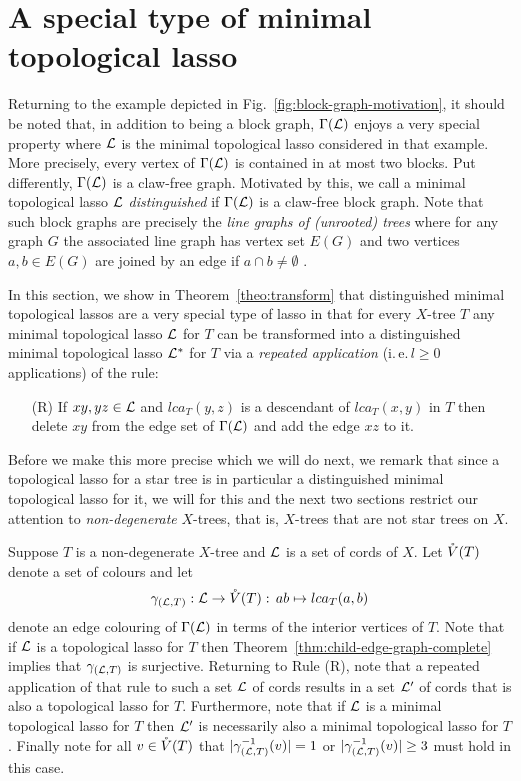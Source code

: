 \section{A special type of minimal topological lasso}
\label{sec:distinguished}

Returning to the example depicted in Fig.~\ref{fig:block-graph-motivation}, it
should be noted that, in addition to being a block graph, $\Gamma({\mathcal L})$ enjoys
a very special property where ${\mathcal L}$ is the minimal topological lasso
considered in that example. More precisely, every vertex of $\Gamma({\mathcal L})$ is
contained in at most two blocks.  Put differently, $\Gamma({\mathcal L})$ is a
claw-free graph. Motivated by this, we call a minimal topological lasso ${\mathcal L}$
{\em distinguished} if $\Gamma({\mathcal L})$ is a claw-free block graph.  Note that
such block graphs are precisely the {\em line graphs of (unrooted) trees}
where for any graph $G$ the associated line graph has vertex set $E(G)$ and
two vertices $a,b\in E(G)$ are joined by an edge if $a\cap b\not=\emptyset$
\cite{H72}.

In this section, we show in Theorem~\ref{theo:transform} that distinguished
minimal topological lassos are a very special type of lasso in that for every
$X$-tree $T$ any minimal topological lasso ${\mathcal L}$ for $T$ can be transformed
into a distinguished minimal topological lasso ${\mathcal L}^*$ for $T$ via a {\em
  repeated application} (i.\,e.\,$l\geq 0$ applications) of the rule:

\begin{enumerate}
\item[(R)] If $xy,yz\in {\mathcal L}$ and $lca_T(y,z)$ is a descendant of $lca_T(x,y)$
  in $T$ then delete $xy$ from the edge set of $\Gamma({\mathcal L})$ and add the edge
  $xz$ to it.
\end{enumerate}

Before we make this more precise which we will do next, we remark that since a
topological lasso for a star tree is in particular a distinguished minimal
topological lasso for it, we will for this and the next two sections restrict
our attention to {\em non-degenerate} $X$-trees, that is, $X$-trees that are
not star trees on $X$.

Suppose $T$ is a non-degenerate $X$-tree and ${\mathcal L}$ is a set of cords of
$X$. Let $\mathring{V}(T)$ denote a set of colours and let
$$
\gamma_{({\mathcal L},T)}:{\mathcal L}\to \mathring{V}(T):\, ab\mapsto lca_T(a,b)
$$
denote an edge colouring of $\Gamma({\mathcal L})$ in terms of the interior vertices of
$T$. Note that if ${\mathcal L}$ is a topological lasso for $T$ then
Theorem~\ref{thm:child-edge-graph-complete} implies that $\gamma_{({\mathcal L},T)}$
is surjective. Returning to Rule (R), note that a repeated application of that
rule to such a set ${\mathcal L}$ of cords results in a set ${\mathcal L}'$ of cords that is
also a topological lasso for $T$. Furthermore, note that if ${\mathcal L}$ is a minimal
topological lasso for $T$ then ${\mathcal L}'$ is necessarily also a minimal
topological lasso for $T$. Finally note for all $v\in \mathring{V}(T)$ that
$|\gamma_{({\mathcal L},T)}^{-1}(v)|=1$ or $|\gamma_{({\mathcal L},T)}^{-1}(v)|\geq 3$ must hold
in this case.


